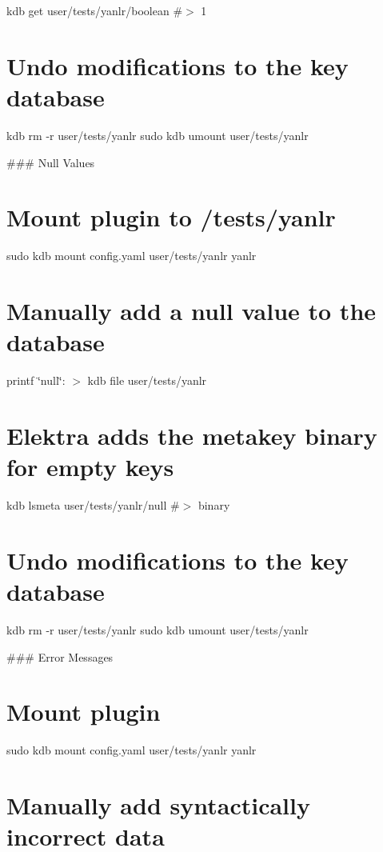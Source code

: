 kdb get user/tests/yanlr/boolean \#$>$ 1

\section*{Undo modifications to the key database}

kdb rm -\/r user/tests/yanlr sudo kdb umount user/tests/yanlr 
\begin{DoxyCode}
### Null Values
\end{DoxyCode}
 \section*{Mount plugin to {\ttfamily /tests/yanlr}}

sudo kdb mount config.\+yaml user/tests/yanlr yanlr

\section*{Manually add a null value to the database}

printf \textquotesingle{}\char`\"{}null\char`\"{}\+:\textquotesingle{} $>$ {\ttfamily kdb file user/tests/yanlr}

\section*{Elektra adds the metakey {\ttfamily binary} for empty keys}

kdb lsmeta user/tests/yanlr/null \#$>$ binary

\section*{Undo modifications to the key database}

kdb rm -\/r user/tests/yanlr sudo kdb umount user/tests/yanlr 
\begin{DoxyCode}
### Error Messages
\end{DoxyCode}
 \section*{Mount plugin}

sudo kdb mount config.\+yaml user/tests/yanlr yanlr

\section*{Manually add syntactically incorrect data}

